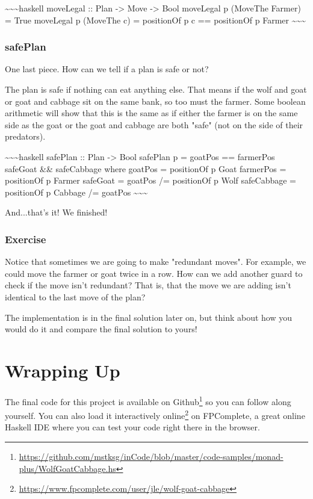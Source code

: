 \documentclass[]{article}
\renewcommand{\href}[2]{#2\footnote{\url{#1}}}
\begin{document}
\textasciitilde{}\textasciitilde{}\textasciitilde{}haskell moveLegal :: Plan
-\textgreater{} Move -\textgreater{} Bool moveLegal p (MoveThe Farmer) = True
moveLegal p (MoveThe c) = positionOf p c == positionOf p Farmer
\textasciitilde{}\textasciitilde{}\textasciitilde{}

\subsubsection{safePlan}

One last piece. How can we tell if a plan is safe or not?

The plan is safe if nothing can eat anything else. That means if the wolf and
goat or goat and cabbage sit on the same bank, so too must the farmer. Some
boolean arithmetic will show that this is the same as if either the farmer is on
the same side as the goat or the goat and cabbage are both "safe" (not on the
side of their predators).

\textasciitilde{}\textasciitilde{}\textasciitilde{}haskell safePlan :: Plan
-\textgreater{} Bool safePlan p = goatPos == farmerPos \textbar{}\textbar{}
safeGoat \&\& safeCabbage where goatPos = positionOf p Goat farmerPos =
positionOf p Farmer safeGoat = goatPos /= positionOf p Wolf safeCabbage =
positionOf p Cabbage /= goatPos
\textasciitilde{}\textasciitilde{}\textasciitilde{}

And...that's it! We finished!

\subsubsection{Exercise}

Notice that sometimes we are going to make "redundant moves". For example, we
could move the farmer or goat twice in a row. How can we add another guard to
check if the move isn't redundant? That is, that the move we are adding isn't
identical to the last move of the plan?

The implementation is in the final solution later on, but think about how you
would do it and compare the final solution to yours!

\section{Wrapping Up}

The final code for this project is available
\href{https://github.com/mstksg/inCode/blob/master/code-samples/monad-plus/WolfGoatCabbage.hs}{on
Github} so you can follow along yourself. You can also
\href{https://www.fpcomplete.com/user/jle/wolf-goat-cabbage}{load it
interactively online} on FPComplete, a great online Haskell IDE where you can
test your code right there in the browser.
\end{document}
